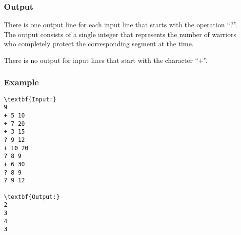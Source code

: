 \subsubsection{   Output  }

    There is one output line for each input line that starts with the operation “?”. The output consists of a single integer that represents the number of warriors who completely protect the corresponding segment at the time.   

     There is no output for input lines that start with the character “+”.    

\subsubsection{   Example  }
\begin{verbatim}
\textbf{Input:}
9
+ 5 10
+ 7 20
+ 3 15
? 9 12
+ 10 20
? 8 9
+ 6 30
? 8 9
? 9 12

\textbf{Output:}
2
3
4
3\end{verbatim}
